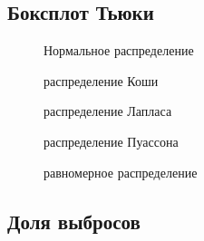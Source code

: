 \documentclass[a4paper]{article}
\begin{document}
\subsection{Боксплот Тьюки}
\begin{figure}[H]
\label{fig:image}
\caption{Нормальное распределение} 
\end{figure}
	
\begin{figure}[H]
\label{fig:image}
\caption{распределение Коши} 
\end{figure}

\begin{figure}[H]
\label{fig:image}
\caption{распределение Лапласа} 
\end{figure}

\begin{figure}[H]
\label{fig:image}
\caption{распределение Пуассона} 
\end{figure}

\begin{figure}[H]
\label{fig:image}
\caption{равномерное распределение} 
\end{figure}							

\subsection{Доля выбросов}
\end{document}

